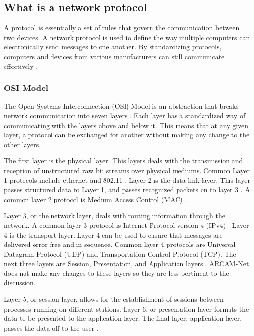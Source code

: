 \subsection{What is a network protocol}

A protocol is essentially a set of rules that govern the communication between two devices. A network protocol is used to define the way multiple computers can electronically send messages to one another. By standardizing protocols, computers and devices from various manufacturers can still communicate effectively \cite{6840086} \cite{0029}. 

\subsubsection{OSI Model}

The Open Systems Interconnection (OSI) Model is an abstraction that breaks network communication into seven layers \cite{6840086} \cite{0030}. Each layer has a standardized way of communicating with the layers above and below it. This means that at any given layer, a protocol can be exchanged for another without making any change to the other layers\cite{6840086}. 

The first layer is the physical layer. This layers deals with the transmission and reception of unstructured raw bit streams over physical mediums. Common Layer 1 protocols include ethernet and 802.11 \cite{6014631} \cite{0030}. Layer 2 is the data link layer. This layer passes structured data to Layer 1, and passes recognized packets on to layer 3 \cite{6840086}. A common layer 2 protocol is Medium Access Control (MAC) \cite{6014631} \cite{0030}. 

Layer 3, or the network layer, deals with routing information through the network. A common layer 3 protocol is Internet Protocol version 4 (IPv4) \cite{6014631} \cite{0031}. Layer 4 is the transport layer. Layer 4 can be used to ensure that messages are delivered error free and in sequence. Common layer 4 protocols are Universal Datagram Protocol (UDP) and Transportation Control Protocol (TCP). The next three layers are Session, Presentation, and Application layers \cite{6840086} \cite{0030}. ARCAM-Net does not make any changes to these layers so they are less pertinent to the discussion. 

Layer 5, or session layer, allows for the establishment of sessions between processes running on different stations. Layer 6, or presentation layer formats the data to be presented to the application layer. The final layer, application layer, passes the data off to the user \cite{6840086}. 

